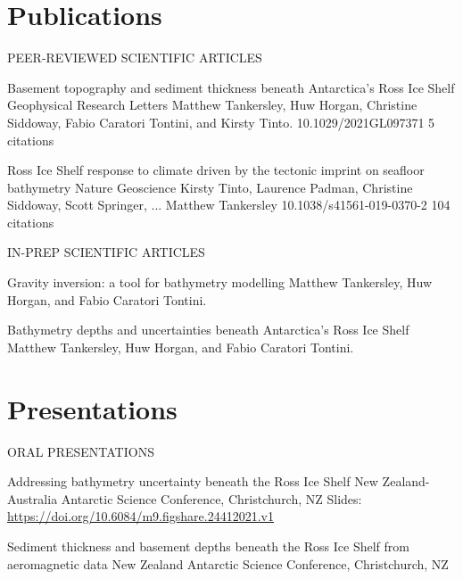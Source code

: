 \documentclass{ExpressiveResume}
\begin{document}
\section{Publications}
\noindent PEER-REVIEWED SCIENTIFIC ARTICLES \newline
\begin{cventries}
    {Basement topography and sediment thickness beneath Antarctica’s Ross Ice Shelf}
    {Geophysical Research Letters}
    {Matthew Tankersley, Huw Horgan, Christine Siddoway, Fabio Caratori Tontini, and Kirsty Tinto.}
    {10.1029/2021GL097371}
    {5 citations}

    {Ross Ice Shelf response to climate driven by the tectonic imprint on seafloor bathymetry}
    {Nature Geoscience}
    {Kirsty Tinto, Laurence Padman, Christine Siddoway, Scott Springer, ... Matthew Tankersley}
    {10.1038/s41561-019-0370-2}
    {104 citations}
\end{cventries}


\noindent IN-PREP SCIENTIFIC ARTICLES \newline
\begin{cventries}
    {Gravity inversion: a tool for bathymetry modelling}
    {Matthew Tankersley, Huw Horgan, and Fabio Caratori Tontini.}

    {Bathymetry depths and uncertainties beneath Antarctica's Ross Ice Shelf}
    {Matthew Tankersley, Huw Horgan, and Fabio Caratori Tontini.}

\end{cventries}


\section{Presentations}
\noindent ORAL PRESENTATIONS \newline
\begin{cventries}
    {Addressing bathymetry uncertainty beneath the Ross Ice Shelf}
    {New Zealand-Australia Antarctic Science Conference, Christchurch, NZ}
    {Slides: \url{https://doi.org/10.6084/m9.figshare.24412021.v1}}
    {}
    {}

    {Sediment thickness and basement depths beneath the Ross Ice Shelf from aeromagnetic data}
    {New Zealand Antarctic Science Conference, Christchurch, NZ}
    {}
    {}

\end{cventries}
\end{document}
